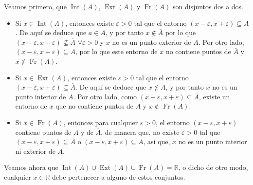 \documentclass[
  spanish,
  a4paper,
]{scrreport}
\providecommand{\tightlist}{%
  \setlength{\itemsep}{0pt}\setlength{\parskip}{0pt}}
\theoremstyle{definition}
\theoremstyle{remark}
\begin{document}
\begin{tcolorbox}[enhanced jigsaw, arc=.35mm, bottomrule=.15mm, bottomtitle=1mm, breakable, colback=white, colbacktitle=quarto-callout-tip-color!10!white, colframe=quarto-callout-tip-color-frame, coltitle=black, left=2mm, leftrule=.75mm, opacityback=0, opacitybacktitle=0.6, rightrule=.15mm, title=\textcolor{quarto-callout-tip-color}{\faLightbulb}\hspace{0.5em}{Solución}, titlerule=0mm, toprule=.15mm, toptitle=1mm]

Veamos primero, que \(\operatorname{Int}(A)\), \(\operatorname{Ext}(A)\)
y \(\operatorname{Fr}(A)\) son disjuntos dos a dos.

\begin{itemize}
\tightlist
\item
  Si \(x\in \operatorname{Int}(A)\), entonces existe \(\varepsilon>0\)
  tal que el entorno \((x-\varepsilon, x+\varepsilon)\subseteq A\). De
  aquí se deduce que \(a\in A\), y por tanto \(x\not\in \overline{A}\)
  por lo que
  \((x-\varepsilon, x+\varepsilon)\not\subseteq \overline{A}\)
  \(\forall \varepsilon>0\) y \(x\) no es un punto exterior de \(A\).
  Por otro lado, \((x-\varepsilon, x+\varepsilon)\subseteq A\), por lo
  que este entorno de \(x\) no contiene puntos de \(\overline{A}\) y
  \(x\not\in \operatorname{Fr}(A)\).
\item
  Si \(x\in \operatorname{Ext}(A)\), entonces existe \(\varepsilon>0\)
  tal que el entorno
  \((x-\varepsilon, x+\varepsilon)\subseteq \overline{A}\). De aquí se
  deduce que \(x\not\in A\), y por tanto \(x\) no es un punto interior
  de \(A\). Por otro lado, como
  \((x-\varepsilon, x+\varepsilon)\subseteq \overline{A}\), existe un
  entorno de \(x\) que no contiene puntos de \(A\) y
  \(x\not\in \operatorname{Fr}(A)\).
\item
  Si \(x\in \operatorname{Fr}(A)\), entonces para cualquier
  \(\varepsilon>0\), el entorno \((x-\varepsilon, x+\varepsilon)\)
  contiene puntos de \(A\) y de \(\overline{A}\), de manera que, no
  existe \(\varepsilon>0\) tal que
  \((x-\varepsilon, x+\varepsilon)\subseteq A\) o
  \((x-\varepsilon, x+\varepsilon)\subseteq \overline{A}\), así que,
  \(x\) no es un punto interior ni exterior de \(A\).
\end{itemize}

Veamos ahora que
\(\operatorname{Int}(A)\cup\operatorname{Ext}(A)\cup\operatorname{Fr}(A)=\mathbb{R}\),
o dicho de otro modo, cualquier \(x\in\mathbb{R}\) debe pertenecer a
alguno de estos conjuntos.


\end{tcolorbox}
\end{document}
